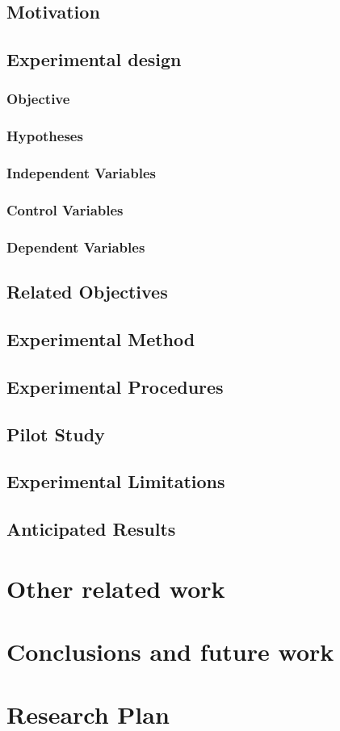 \section{Motivation}
\section{Experimental design}
\subsection{Objective}
\subsection{Hypotheses}
\subsection{Independent Variables}
\subsection{Control Variables}
\subsection{Dependent Variables}
\section{Related Objectives}
\section{Experimental Method}
\section{Experimental Procedures}
\section{Pilot Study}
\section{Experimental Limitations}
\section{Anticipated Results}
\chapter{Other related work}
\chapter{Conclusions and future work}
\chapter{Research Plan}
